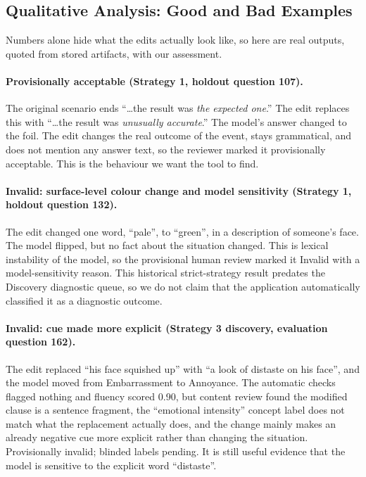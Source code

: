 \documentclass[11pt,a4paper]{article}
\begin{document}
\subsection{Qualitative Analysis: Good and Bad Examples}
\label{sec:qualitative}

Numbers alone hide what the edits actually look like, so here are real outputs, quoted
from stored artifacts, with our assessment.

\paragraph{Provisionally acceptable (Strategy 1, holdout question 107).}
The original scenario ends ``\ldots the result was \emph{the expected one}.'' The edit
replaces this with ``\ldots the result was \emph{unusually accurate}.'' The model's
answer changed to the foil. The edit changes the real outcome of the event, stays
grammatical, and does not mention any answer text, so the reviewer marked it
provisionally acceptable. This is the behaviour we want the tool to find.

\paragraph{Invalid: surface-level colour change and model sensitivity (Strategy 1,
holdout question 132).}
The edit changed one word, ``pale'', to ``green'', in a description of someone's face.
The model flipped, but no fact about the situation changed. This is lexical
instability of the model, so the provisional human review marked it Invalid with a
model-sensitivity reason. This historical strict-strategy result predates the
Discovery diagnostic queue, so we do not claim that the application automatically
classified it as a diagnostic outcome.

\paragraph{Invalid: cue made more explicit (Strategy 3 discovery, evaluation
question 162).}
The edit replaced ``his face squished up'' with ``a look of distaste on his face'',
and the model moved from Embarrassment to Annoyance. The automatic checks flagged
nothing and fluency scored 0.90, but content review found the modified clause is a
sentence fragment, the ``emotional intensity'' concept label does not match what the
replacement actually does, and the change mainly makes an already negative cue more
explicit rather than changing the situation. Provisionally invalid; blinded labels
pending. It is still useful evidence that the model is sensitive to the explicit word
``distaste''.
\end{document}
